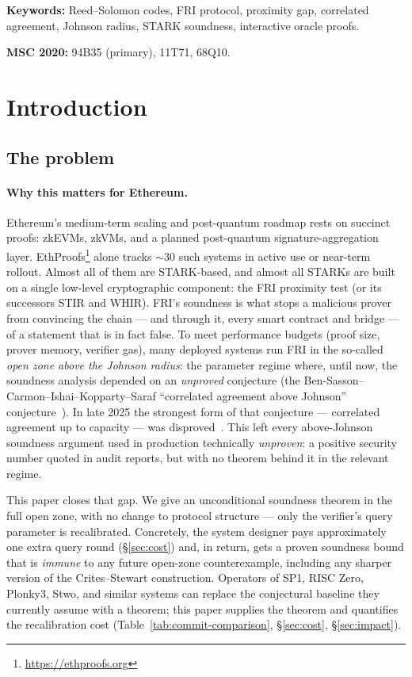 \documentclass[11pt]{article}
\begin{document}
\smallskip
\noindent\textbf{Keywords:} Reed--Solomon codes, FRI protocol, proximity gap, correlated agreement, Johnson radius, STARK soundness, interactive oracle proofs.

\smallskip
\noindent\textbf{MSC 2020:} 94B35 (primary), 11T71, 68Q10.


\section{Introduction}
\label{sec:intro}

\subsection{The problem}

\paragraph{Why this matters for Ethereum.}
Ethereum's medium-term scaling and post-quantum roadmap rests on succinct proofs: zkEVMs, zkVMs, and a planned post-quantum signature-aggregation layer.  EthProofs\footnote{\url{https://ethproofs.org}} alone tracks ${\sim}30$ such systems in active use or near-term rollout.  Almost all of them are STARK-based, and almost all STARKs are built on a single low-level cryptographic component: the FRI proximity test (or its successors STIR and WHIR).  FRI's soundness is what stops a malicious prover from convincing the chain --- and through it, every smart contract and bridge --- of a statement that is in fact false.  To meet performance budgets (proof size, prover memory, verifier gas), many deployed systems run FRI in the so-called \emph{open zone above the Johnson radius}: the parameter regime where, until now, the soundness analysis depended on an \emph{unproved} conjecture (the Ben-Sasson--Carmon--Ishai--Kopparty--Saraf ``correlated agreement above Johnson'' conjecture~\cite{ABF}).  In late 2025 the strongest form of that conjecture --- correlated agreement up to capacity --- was disproved~\cite{CritesStewart,Kambire}.  This left every above-Johnson soundness argument used in production technically \emph{unproven}: a positive security number quoted in audit reports, but with no theorem behind it in the relevant regime.

This paper closes that gap.  We give an unconditional soundness theorem in the full open zone, with no change to protocol structure --- only the verifier's query parameter is recalibrated.  Concretely, the system designer pays approximately one extra query round (\S\ref{sec:cost}) and, in return, gets a proven soundness bound that is \emph{immune} to any future open-zone counterexample, including any sharper version of the Crites--Stewart construction.  Operators of SP1, RISC Zero, Plonky3, Stwo, and similar systems can replace the conjectural baseline they currently assume with a theorem; this paper supplies the theorem and quantifies the recalibration cost (Table~\ref{tab:commit-comparison}, \S\ref{sec:cost}, \S\ref{sec:impact}).
\end{document}

